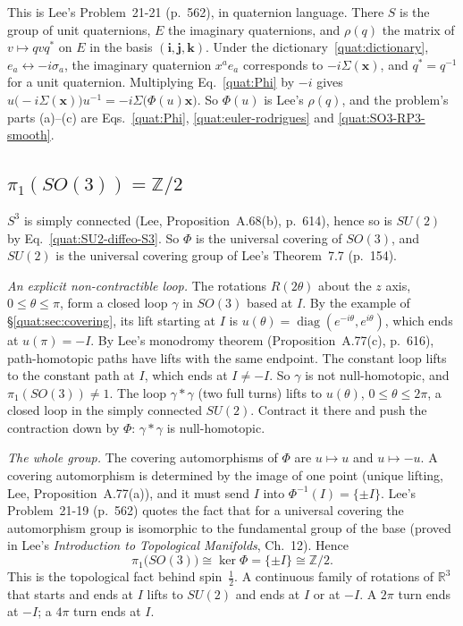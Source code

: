 This is Lee's Problem~21-21 (p.~562), in quaternion language. There $S$ is
the group of unit quaternions, $E$ the imaginary quaternions, and $\rho(q)$
the matrix of $v\mapsto qvq^*$ on $E$ in the basis $(\mathbf i,\mathbf
j,\mathbf k)$. Under the dictionary~\eqref{quat:dictionary},
$e_a\leftrightarrow-i\sigma_a$, the imaginary quaternion $x^ae_a$ corresponds
to $-i\Sigma(\mathbf x)$, and $q^*=q^{-1}$ for a unit quaternion. Multiplying
Eq.~\eqref{quat:Phi} by $-i$ gives
$u\bigl(-i\Sigma(\mathbf x)\bigr)u^{-1}=-i\Sigma\bigl(\Phi(u)\mathbf x\bigr)$.
So $\Phi(u)$ is Lee's $\rho(q)$, and the problem's parts (a)--(c) are
Eqs.~\eqref{quat:Phi}, \eqref{quat:euler-rodrigues} and
\eqref{quat:SO3-RP3-smooth}.

\subsection{\texorpdfstring{$\pi_1(SO(3))=\mathbb Z/2$}{pi1(SO(3)) = Z/2}}
$S^3$ is simply connected (Lee, Proposition~A.68(b), p.~614), hence so is
$SU(2)$ by Eq.~\eqref{quat:SU2-diffeo-S3}. So $\Phi$ is the universal
covering of $SO(3)$, and $SU(2)$ is the universal covering group of Lee's
Theorem~7.7 (p.~154).

\emph{An explicit non-contractible loop.} The rotations $R(2\theta)$ about the
$z$ axis, $0\le\theta\le\pi$, form a closed loop $\gamma$ in $SO(3)$ based at
$I$. By the example of \S\ref{quat:sec:covering}, its lift starting at $I$ is
$u(\theta)=\operatorname{diag}(e^{-i\theta},e^{i\theta})$, which ends at
$u(\pi)=-I$. By Lee's monodromy theorem (Proposition~A.77(c), p.~616),
path-homotopic paths have lifts with the same endpoint. The constant loop
lifts to the constant path at $I$, which ends at $I\ne-I$. So $\gamma$ is not
null-homotopic, and $\pi_1(SO(3))\ne1$. The loop $\gamma*\gamma$ (two full
turns) lifts to $u(\theta)$, $0\le\theta\le2\pi$, a closed loop in the simply
connected $SU(2)$. Contract it there and push the contraction down by $\Phi$:
$\gamma*\gamma$ is null-homotopic.

\emph{The whole group.} The covering automorphisms of $\Phi$ are $u\mapsto u$
and $u\mapsto-u$. A covering automorphism is determined by the image of one
point (unique lifting, Lee, Proposition~A.77(a)), and it must send $I$ into
$\Phi^{-1}(I)=\{\pm I\}$. Lee's Problem~21-19 (p.~562) quotes the fact that
for a universal covering the automorphism group is isomorphic to the
fundamental group of the base (proved in Lee's \emph{Introduction to
Topological Manifolds}, Ch.~12). Hence
\begin{equation}\label{quat:pi1-SO3}
 \pi_1\bigl(SO(3)\bigr)\cong\ker\Phi=\{\pm I\}\cong\mathbb Z/2 .
\end{equation}
This is the topological fact behind spin~$\tfrac12$. A continuous family of
rotations of $\mathbb R^3$ that starts and ends at $I$ lifts to $SU(2)$ and
ends at $I$ or at $-I$. A $2\pi$ turn ends at $-I$; a $4\pi$ turn ends at $I$.

